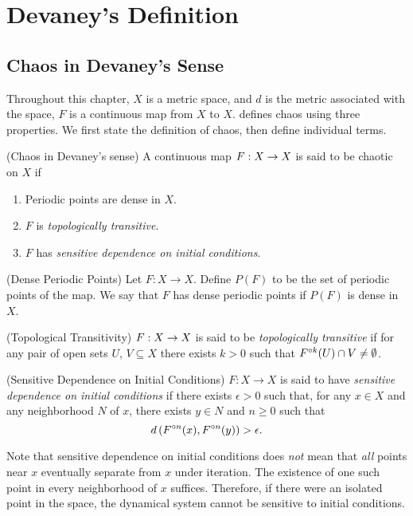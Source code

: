 \documentclass[12pt,draft,twoside]{book}
\begin{document}
\chapter{Devaney's Definition}
\label{chap:devaney}
\section{Chaos in Devaney's Sense}
Throughout this chapter, $X$ is a metric space, and $d$ is the metric associated with the space, $F$ is a continuous map from $X$ to $X$.
\citet{devaney} defines chaos using three properties.
We first state the definition of chaos, then define individual terms.
\begin{definition}
  (Chaos in Devaney's sense) 
  A continuous map $F: X\rightarrow X$ is said to be chaotic on $X$ if
  \begin{enumerate}
    \item Periodic points are dense in $X$.
    \item $F$ is \textit{topologically transitive}.
    \item $F$ has \textit{sensitive dependence on initial conditions}.
  \end{enumerate}
\end{definition}
%
\begin{definition}
  (Dense Periodic Points) 
  Let $F: X \to X$.
  Define $P(F)$ to be the set of periodic points of the map.
  We say that $F$ has dense periodic points if $P(F)$ is dense in $X$.
\end{definition}
%
\begin{definition}
  (Topological Transitivity) 
  $F: X \rightarrow X$ is said to be \textit{topologically transitive} if for any pair of open sets $U$, $V \subseteq X$ there exists $k > 0$ such that $F^{\circ k}(U) \cap V \neq \emptyset$.
  \label{defn:transitivity}
\end{definition}
%
\begin{definition}
  (Sensitive Dependence on Initial Conditions) 
  $F: X \rightarrow X$ is said to have \textit{sensitive dependence on initial conditions} if there exists $\epsilon > 0$ such that, for any $x \in X$ and any neighborhood $N$ of $x$, there exists $y\in N$ and $n\geq 0$ such that 
  \begin{equation*}
    d\left( F^{\circ n}(x), F^{\circ n}(y) \right) > \epsilon.
  \end{equation*}
  \label{defn:sdic}
\end{definition}
%
\begin{remark}
  Note that sensitive dependence on initial conditions does \textit{not} mean that \textit{all} points near $x$ eventually separate from $x$ under iteration.
The existence of one such point in every neighborhood of $x$ suffices.
Therefore, if there were an isolated point in the space, the dynamical system cannot be sensitive to initial conditions.
\end{remark}
\end{document}
